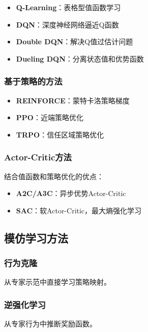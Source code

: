 \documentclass[12pt,a4paper]{ctexart}
\begin{document}
\begin{itemize}[leftmargin=2em]
    \item \textbf{Q-Learning}：表格型值函数学习
    \item \textbf{DQN}：深度神经网络逼近Q函数
    \item \textbf{Double DQN}：解决Q值过估计问题
    \item \textbf{Dueling DQN}：分离状态值和优势函数
\end{itemize}

\subsubsection{基于策略的方法}

\begin{itemize}[leftmargin=2em]
    \item \textbf{REINFORCE}：蒙特卡洛策略梯度
    \item \textbf{PPO}：近端策略优化
    \item \textbf{TRPO}：信任区域策略优化
\end{itemize}

\subsubsection{Actor-Critic方法}

结合值函数和策略优化的优点：
\begin{itemize}[leftmargin=2em]
    \item \textbf{A2C/A3C}：异步优势Actor-Critic
    \item \textbf{SAC}：软Actor-Critic，最大熵强化学习
\end{itemize}

\subsection{模仿学习方法}

\subsubsection{行为克隆}

从专家示范中直接学习策略映射。

\subsubsection{逆强化学习}

从专家行为中推断奖励函数。
\end{document}
